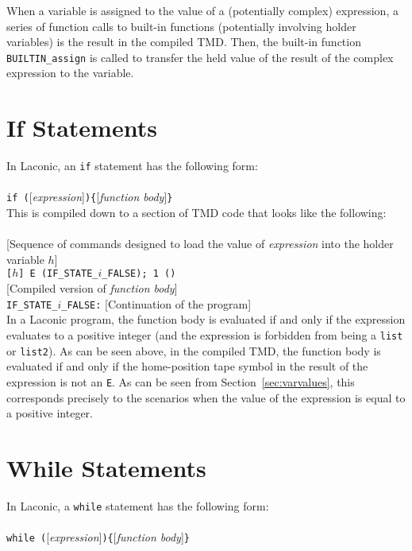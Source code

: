 \documentclass[11pt]{article}
\begin{document}
When a variable is assigned to the value of a (potentially complex) expression, a series of function calls to built-in functions (potentially involving holder variables) is the result in the compiled TMD. Then, the built-in function \texttt{BUILTIN_assign} is called to transfer the held value of the result of the complex expression to the variable. \\

\section{If Statements}

In Laconic, an \texttt{if} statement has the following form: \\ \\
\texttt{if (}[\emph{expression}]\texttt{)\{}[\emph{function body}]\texttt{\}} \\

This is compiled down to a section of TMD code that looks like the following: \\ \\
{}[Sequence of commands designed to load the value of \emph{expression} into the holder variable $h$] \\
\texttt{[}$h$\texttt{] E (IF_STATE_}$i$\texttt{_FALSE); 1 ()} \\
{}[Compiled version of \emph{function body}] \\
\texttt{IF_STATE_}$i$\texttt{_FALSE:} [Continuation of the program] \\

In a Laconic program, the function body is evaluated if and only if the expression evaluates to a positive integer (and the expression is forbidden from being a \texttt{list} or \texttt{list2}). As can be seen above, in the compiled TMD, the function body is evaluated if and only if the home-position tape symbol in the result of the expression is not an \texttt{E}. As can be seen from Section~\ref{sec:varvalues}, this corresponds precisely to the scenarios when the value of the expression is equal to a positive integer. 

\section{While Statements}

In Laconic, a \texttt{while} statement has the following form: \\ \\ 
\texttt{while (}[\emph{expression}]\texttt{)\{}[\emph{function body}]\texttt{\}} \\
\end{document}
